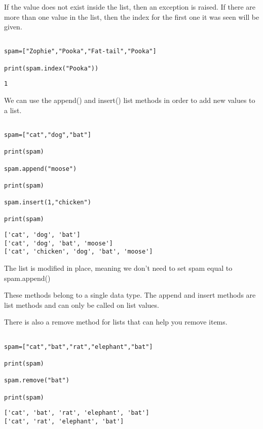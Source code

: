 \documentclass[11pt]{article}
\begin{document}
If the value does not exist inside the list, then an exception is raised. If there are more than one value in the list, then the index for the first one it was seen will be given.

\begin{verbatim}

spam=["Zophie","Pooka","Fat-tail","Pooka"]

print(spam.index("Pooka"))

\end{verbatim}

\begin{verbatim}
1
\end{verbatim}


We can use the append() and insert() list methods in order to add new values to a list.



\begin{verbatim}

spam=["cat","dog","bat"]

print(spam)

spam.append("moose")

print(spam)

spam.insert(1,"chicken")

print(spam)

\end{verbatim}

\begin{verbatim}
['cat', 'dog', 'bat']
['cat', 'dog', 'bat', 'moose']
['cat', 'chicken', 'dog', 'bat', 'moose']
\end{verbatim}



The list is modified in place, meaning we don't need to set spam equal to spam.append()

These methods belong to a single data type. The append and insert methods are list methods and can only be called on list values.

There is also a remove method for lists that can help you remove items.

\begin{verbatim}

spam=["cat","bat","rat","elephant","bat"]

print(spam)

spam.remove("bat")

print(spam)
\end{verbatim}

\begin{verbatim}
['cat', 'bat', 'rat', 'elephant', 'bat']
['cat', 'rat', 'elephant', 'bat']
\end{verbatim}
\end{document}
